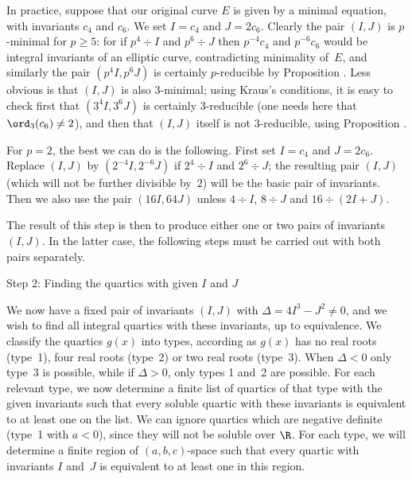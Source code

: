 In practice, suppose that our original curve $E$ is given by a minimal
equation, with invariants $c_4$ and $c_6$.  We set $I=c_4$ and
$J=2c_6$.  Clearly the pair $(I,J)$ is $p$-minimal for $p\ge5$: for if
$p^4\div I$ and $p^6\div J$ then $p^{-4}c_4$ and $p^{-6}c_6$ would be
integral invariants of an elliptic curve, contradicting minimality
of~$E$, and similarly the pair $(p^4I,p^6J)$ is certainly
$p$-reducible by Proposition \IJreduction {}.  Less
obvious is that $(I,J)$ is also $3$-minimal; using Kraus's conditions,
it is easy to check first that $(3^4I,3^6J)$ is certainly
$3$-reducible (one needs here that $\ord_3(c_6)\not=2$), and then that
$(I,J)$ itself is not $3$-reducible, using Proposition \IJreduction
{}.

For $p=2$, the best we can do is the following.  First set $I=c_4$ and
$J=2c_6$.  Replace $(I,J)$ by $(2^{-4}I,2^{-6}J)$ if $2^4\div I$ and
$2^6\div J$; the resulting pair $(I,J)$ (which will not be further
divisible by~$2$) will be the basic pair of invariants.  Then we also
use the pair $(16I,64J)$ unless $4\div I$, $8\div J$ and
$16\div(2I+J)$.

The result of this step is then to produce either one or two pairs of
invariants $(I,J)$.  In the latter case, the following steps must be
carried out with both pairs separately.  
%
%

\subhead Step 2: Finding the quartics with given $I$ and $J$ \endsubhead

We now have a fixed pair of invariants $(I,J)$ with
$\Delta=4I^3-J^2\not=0$, and we wish to find all integral quartics
with these invariants, up to equivalence.  We classify the quartics
$g(x)$ into types, according as $g(x)$ has no real roots (type~1),
four real roots (type~2) or two real roots (type~3).  When $\Delta<0$
only type~3 is possible, while if $\Delta>0$, only types 1 and~2 are
possible.  For each relevant type, we now determine a finite list of
quartics of that type with the given invariants such that every
soluble quartic with these invariants is equivalent to at least one on
the list.  We can ignore quartics which are negative definite (type~1
with $a<0$), since they will not be soluble over $\R$.  For each type,
we will determine a finite region of $(a,b,c)$-space such that every
quartic with invariants $I$ and~$J$ is equivalent to at least one in
this region.

